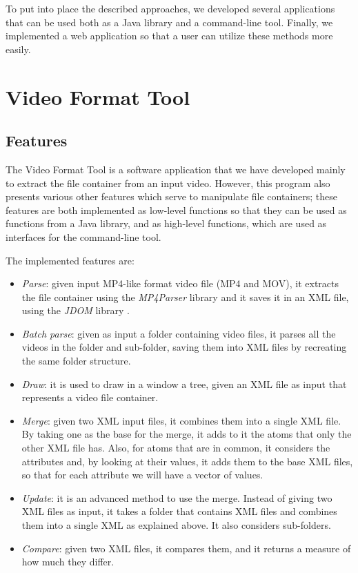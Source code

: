 To put into place the described approaches, we developed several applications that can be used both as a Java library and a command-line tool. Finally, we implemented a web application so that a user can utilize these methods more easily.

\section{Video Format Tool}

\subsection{Features}

The Video Format Tool is a software application that we have developed mainly to extract the file container from an input video. However, this program also presents various other features which serve to manipulate file containers; these features are both implemented as low-level functions so that they can be used as functions from a Java library, and as high-level functions, which are used as interfaces for the command-line tool.

The implemented features are:
\begin{itemize}
\item \emph{Parse}: given input MP4-like format video file (MP4 and MOV), it extracts the file container using the \emph{MP4Parser} library \cite{mp4parser} and it saves it in an XML file, using the \emph{JDOM} library \cite{jdom}.
\item \emph{Batch parse}: given as input a folder containing video files, it parses all the videos in the folder and sub-folder, saving them into XML files by recreating the same folder structure.
\item \emph{Draw}: it is used to draw in a window a tree, given an XML file as input that represents a video file container.
\item \emph{Merge}: given two XML input files, it combines them into a single XML file. By taking one as the base for the merge, it adds to it the atoms that only the other XML file has. Also, for atoms that are in common, it considers the attributes and, by looking at their values, it adds them to the base XML files, so that for each attribute we will have a vector of values.
\item \emph{Update}: it is an advanced method to use the merge. Instead of giving two XML files as input, it takes a folder that contains XML files and combines them into a single XML as explained above. It also considers sub-folders.
\item \emph{Compare}: given two XML files, it compares them, and it returns a measure of how much they differ.
\end{itemize}

